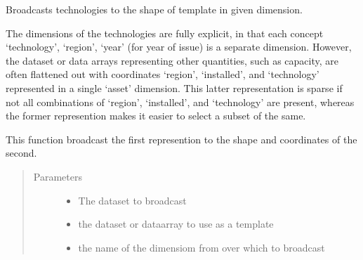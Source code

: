 \documentclass[letterpaper,10pt,english]{sphinxmanual}
\begin{document}
\begin{fulllineitems}
\label{\detokenize{api:muse.utilities.broadcast_techs}}
Broadcasts technologies to the shape of template in given dimension.

The dimensions of the technologies are fully explicit, in that each concept
‘technology’, ‘region’, ‘year’ (for year of issue) is a separate dimension.
However, the dataset or data arrays representing other quantities, such as
capacity, are often flattened out with coordinates ‘region’, ‘installed’,
and ‘technology’ represented in a single ‘asset’ dimension. This latter
representation is sparse if not all combinations of ‘region’, ‘installed’,
and ‘technology’ are present, whereas the former represention makes it
easier to select a subset of the same.

This function broadcast the first represention to the shape and coordinates
of the second.
\begin{quote}\begin{description}
\item[{Parameters}] \leavevmode\begin{itemize}
\item {} 
 \textendash{} The dataset to broadcast

\item {} 
 \textendash{} the dataset or data\sphinxhyphen{}array to use as a template

\item {} 
 \textendash{} the name of the dimensiom from  over which to
broadcast


\end{itemize}
\end{description}
\end{quote}
\end{fulllineitems}
\end{document}
